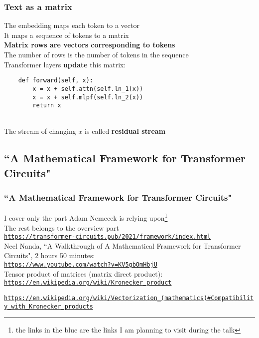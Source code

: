 \documentclass{beamer}
\newcommand{\msblue}[1]{{\color{myblue} #1}}
\begin{document}
\begin{frame}[fragile]

  \frametitle{Text as a matrix}

The embedding maps each token to a vector\\[2ex]

It maps a sequence of tokens to a matrix\\[2ex]

{\bf Matrix rows are vectors corresponding to tokens}\\[2ex]

The number of rows is the number of tokens in the sequence\\[2ex]

Transformer layers {\bf update} this matrix:\\[2ex]

\begin{verbatim}
    def forward(self, x):
        x = x + self.attn(self.ln_1(x))
        x = x + self.mlpf(self.ln_2(x))
        return x
\end{verbatim}\\[2ex]

The stream of changing $x$ is called {\bf residual stream}

\end{frame}

\subsection{``A Mathematical Framework for Transformer Circuits"}

\begin{frame}

  \frametitle{``A Mathematical Framework for Transformer Circuits"}

I cover only the part Adam Nemecek is relying upon\footnote{\msblue{the links in the blue are the links I am planning to visit during the talk}}\\[2ex]

The rest belongs to the overview part\\[2ex]

\msblue{\href{https://transformer-circuits.pub/2021/framework/index.html}{\tt\small https://transformer-circuits.pub/2021/framework/index.html}}\\[2ex]

Neel Nanda, ``A Walkthrough of A Mathematical Framework for Transformer Circuits", 2 hours 50 minutes:\\
\href{https://www.youtube.com/watch?v=KV5gbOmHbjU}{\tt\small https://www.youtube.com/watch?v=KV5gbOmHbjU}\\[2ex]

Tensor product of matrices (matrix direct product):\\
\msblue{\href{https://en.wikipedia.org/wiki/Kronecker\_product}{\tt\small https://en.wikipedia.org/wiki/Kronecker\_product}}

\msblue{\href{https://en.wikipedia.org/wiki/Vectorization\_(mathematics)\#Compatibility\_with\_Kronecker\_products}{\tt\tiny https://en.wikipedia.org/wiki/Vectorization\_(mathematics)\#Compatibility\_with\_Kronecker\_products}}

\end{frame}
\end{document}
